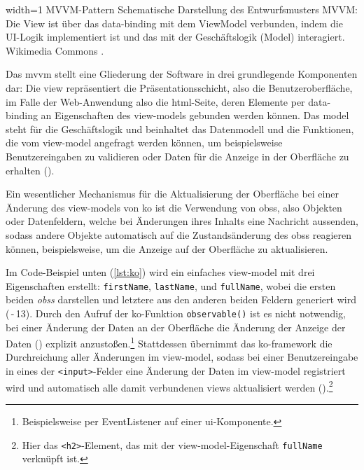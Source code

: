 	{width=1\textwidth}
	{MVVM-Pattern}
		{Schematische Darstellung des Entwurfsmusters MVVM: Die View ist über das \gls{data-binding} mit dem ViewModel verbunden, indem die UI-Logik implementiert ist und das mit der Geschäftslogik (Model) interagiert.}
	{Wikimedia Commons \cite{MVVMPattern}.}

Das \gls{mvvm} stellt eine Gliederung der Software in drei grundlegende Komponenten dar:
Die \gls{view} repräsentiert die Präsentationsschicht, also die Benutzeroberfläche, im Falle der Web-Anwendung also die \gls{html}-Seite, deren Elemente per \gls{data-binding} an Eigenschaften des \glspl{view-model} gebunden werden können. 
Das \gls{model} steht für die Geschäftslogik und beinhaltet das Datenmodell und die Funktionen, die vom \gls{view-model} angefragt werden können, um beispielsweise Benutzereingaben zu validieren oder Daten für die Anzeige in der Oberfläche zu erhalten ().

Ein wesentlicher Mechanismus für die Aktualisierung der Oberfläche bei einer Änderung des \glspl{view-model} von \gls{ko} ist die Verwendung von \glspl{obs}, also Objekten oder Datenfeldern, welche bei Änderungen ihres Inhalts eine Nachricht aussenden, sodass andere Objekte automatisch auf die Zustandsänderung des \glspl{obs} reagieren können, beispielsweise, um die Anzeige auf der Oberfläche zu aktualisieren.

Im Code-Beispiel unten (\autoref{lst:ko}) wird ein einfaches \gls{view-model} mit drei Eigenschaften erstellt: \lstinline|firstName|, \lstinline|lastName|, und \lstinline|fullName|, wobei die ersten beiden \emph{\glspl{obs}} darstellen und letztere aus den anderen beiden Feldern generiert wird (\,-\,13).
Durch den Aufruf der \gls{ko}-Funktion \lstinline|observable()| ist es nicht notwendig, bei einer Änderung der Daten an der Oberfläche die Änderung der Anzeige der Daten () explizit anzustoßen.\footnote{Beispielsweise per EventListener auf einer \gls{ui}-Komponente.}
Stattdessen übernimmt das \gls{ko}-\gls{framework} die Durchreichung aller Änderungen im \gls{view-model}, sodass bei einer Benutzereingabe in eines der \lstinline|<input>|-Felder eine Änderung der Daten im \gls{view-model} registriert wird und automatisch alle damit verbundenen \glspl{view} aktualisiert werden ().\footnote{Hier das \texttt{<h2>}-Element, das mit der \gls{view-model}-Eigenschaft \texttt{fullName} verknüpft ist.}


